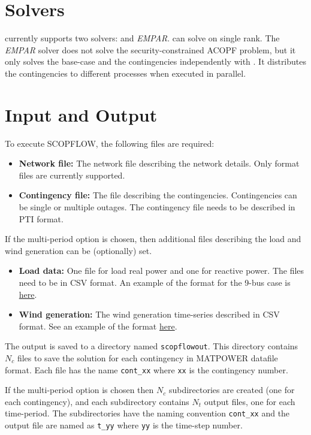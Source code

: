 \section{Solvers}
\scopflow currently supports two solvers: \ipopt and \emph{EMPAR}. \ipopt can solve \scopflow on single rank. The \emph{EMPAR} solver does not solve the security-constrained ACOPF problem, but it only solves the base-case and the contingencies independently with \opflow. It distributes the contingencies to different processes when executed in parallel.

\section{Input and Output}
To execute SCOPFLOW, the following files are required:
\begin{itemize}
    \item \textbf{Network file:} The network file describing the network details. Only \matpower format files are currently supported.
    \item \textbf{Contingency file:} The file describing the contingencies. Contingencies can be single or multiple outages. The contingency file needs to be described in PTI format.
\end{itemize}
If the multi-period option is chosen, then additional files describing the load and wind generation can be (optionally) set.
\begin{itemize}
    \item \textbf{Load data:} One file for load real power and one for reactive power. The files need to be in CSV format. An example of the format for the 9-bus case is \href{https://gitlab.pnnl.gov/exasgd/frameworks/exago/-/tree/master/datafiles/case9}{here}.
    \item \textbf{Wind generation:} The wind generation time-series described in CSV format. See an example of the format \href{https://gitlab.pnnl.gov/exasgd/frameworks/exago/-/tree/master/datafiles/case9}{here}.
\end{itemize}

The \scopflow output is saved to a directory named \texttt{scopflowout}. This
directory contains $N_c$ files to save the solution for each contingency in
MATPOWER datafile format. Each file has the name \texttt{cont_xx} where \texttt{xx} is the contingency number. 

If the multi-period option is chosen then $N_c$ subdirectories are created (one
for each contingency), and each subdirectory contains $N_t$ output files, one
for each time-period. The subdirectories have the naming convention
\texttt{cont_xx} and the output file are named as \texttt{t_yy} where \texttt{yy} is the time-step number.

